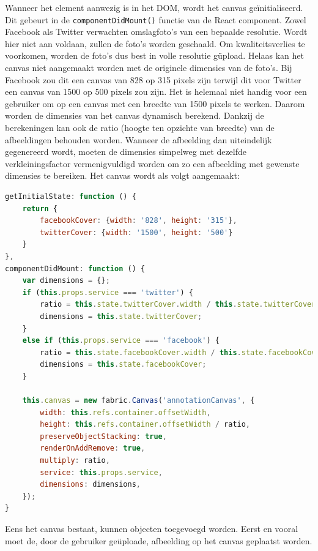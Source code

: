 Wanneer het element aanwezig is in het DOM, wordt het canvas ge\"{i}nitialiseerd. Dit gebeurt in de \lstinline{componentDidMount()} functie van de React component. Zowel Facebook als Twitter verwachten omslagfoto's van een bepaalde resolutie. Wordt hier niet aan voldaan, zullen de foto's worden geschaald. Om kwaliteitsverlies te voorkomen, worden de foto's dus best in volle resolutie g\"{u}pload. Helaas kan het canvas niet aangemaakt worden met de originele dimensies van de foto's. Bij Facebook zou dit een canvas van 828 op 315 pixels zijn terwijl dit voor Twitter een canvas van 1500 op 500 pixels zou zijn. Het is helemaal niet handig voor een gebruiker om op een canvas met een breedte van 1500 pixels te werken. Daarom worden de dimensies van het canvas dynamisch berekend. Dankzij de berekeningen kan ook de ratio (hoogte ten opzichte van breedte) van de afbeeldingen behouden worden. Wanneer de afbeelding dan uiteindelijk gegenereerd wordt, moeten de dimensies simpelweg met dezelfde verkleiningsfactor vermenigvuldigd worden om zo een afbeelding met gewenste dimensies te bereiken. Het canvas wordt als volgt aangemaakt:

\begin{lstlisting}[language=javascript]
getInitialState: function () {
	return {
		facebookCover: {width: '828', height: '315'},
		twitterCover: {width: '1500', height: '500'}
	}
},
componentDidMount: function () {
	var dimensions = {};
	if (this.props.service === 'twitter') {
		ratio = this.state.twitterCover.width / this.state.twitterCover.height;
		dimensions = this.state.twitterCover;
	}
	else if (this.props.service === 'facebook') {
		ratio = this.state.facebookCover.width / this.state.facebookCover.height;
		dimensions = this.state.facebookCover;
	}
		
	this.canvas = new fabric.Canvas('annotationCanvas', {
		width: this.refs.container.offsetWidth,
		height: this.refs.container.offsetWidth / ratio,
		preserveObjectStacking: true,
		renderOnAddRemove: true,
		multiply: ratio,
		service: this.props.service,
		dimensions: dimensions,
	});
}
\end{lstlisting}

Eens het canvas bestaat, kunnen objecten toegevoegd worden. Eerst en vooral moet de, door de gebruiker ge\"{u}ploade, afbeelding op het canvas geplaatst worden. 


